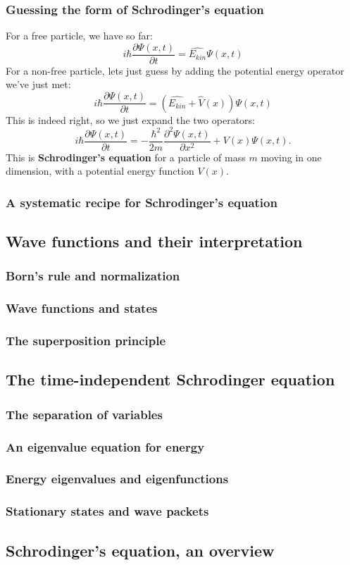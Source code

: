 \documentclass{article}
\begin{document}
\subsubsection{Guessing the form of Schrodinger's equation}
For a free particle, we have so far:
$$ i\hbar \frac{\partial\Psi(x,t)}
               {\partial t}       = \hat{E_{kin}}\Psi(x,t) $$
For a non-free particle, lets just guess by adding the potential energy operator we've just met:
$$ i\hbar \frac{\partial\Psi(x,t)}
               {\partial t}       = (\hat{E_{kin}} + \hat{V}(x))\Psi(x,t) $$
This is indeed right, so we just expand the two operators:
$$ i\hbar \frac{\partial\Psi(x,t)}
               {\partial t}       = - \frac{\hbar^2}{2m} \frac{\partial^2\Psi(x,t)}{\partial x^2} + V(x)\Psi(x,t).$$
This is \textbf{Schrodinger's equation} for a particle of mass $m$ moving in one dimension, with a potential energy function $V(x)$.

\subsubsection{A systematic recipe for Schrodinger's equation}
\subsection{Wave functions and their interpretation}
\subsubsection{Born's rule and normalization}
\subsubsection{Wave functions and states}
\subsubsection{The superposition principle}
\subsection{The time-independent Schrodinger equation}
\subsubsection{The separation of variables}
\subsubsection{An eigenvalue equation for energy}
\subsubsection{Energy eigenvalues and eigenfunctions}
\subsubsection{Stationary states and wave packets}
\subsection{Schrodinger's equation, an overview}
\end{document}
